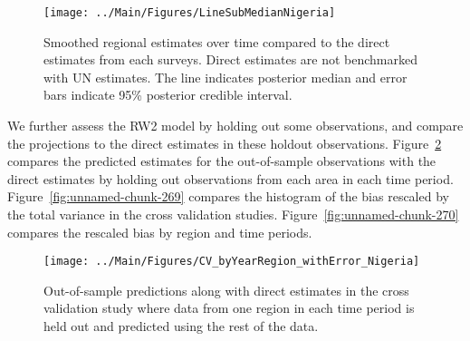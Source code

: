 \documentclass[12pt]{article}\usepackage[]{graphicx}\usepackage[]{color}
\newenvironment{knitrout}{}{} %
\begin{document}
\begin{knitrout}
\color{fgcolor}\begin{figure}[bht]

{\centering \texttt{[image: ../Main/Figures/LineSubMedianNigeria]} 

}

\caption[Smoothed regional estimates over time compared to the direct estimates from each surveys]{Smoothed regional estimates over time compared to the direct estimates from each surveys. Direct estimates are not benchmarked with UN estimates. The line indicates posterior median and error bars indicate 95\% posterior credible interval.}\label{fig:unnamed-chunk-267}
\end{figure}


\end{knitrout}
We further assess the RW2 model by holding out some observations, and compare the projections to the direct estimates in these holdout observations. Figure~\ref{fig:unnamed-chunk-268} compares the predicted estimates for the out-of-sample observations  with the direct estimates by holding out observations from each area in each time period.  Figure~\ref{fig:unnamed-chunk-269} compares the histogram of the bias rescaled by the total variance in the cross validation studies. Figure~\ref{fig:unnamed-chunk-270} compares the rescaled bias by region and time periods.



 
\begin{knitrout}
\color{fgcolor}\begin{figure}[bht]

{\centering \texttt{[image: ../Main/Figures/CV\_byYearRegion\_withError\_Nigeria]} 

}

\caption[Out-of-sample predictions along with direct estimates in the cross validation study where data from one region in each time period is held out and predicted using the rest of the data]{Out-of-sample predictions along with direct estimates in the cross validation study where data from one region in each time period is held out and predicted using the rest of the data.}\label{fig:unnamed-chunk-268}
\end{figure}


\end{knitrout}
\end{document}
